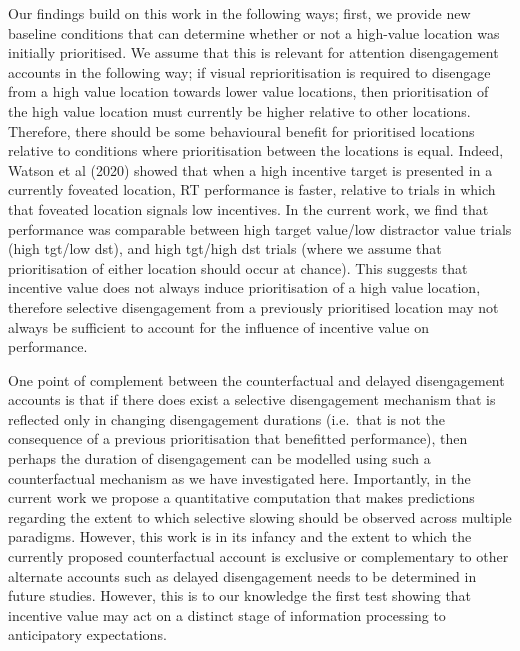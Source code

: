 \documentclass[11pt,halfline,a4paper,]{ouparticle}
\begin{document}
Our findings build on this work in the following ways; first, we provide new baseline conditions that can determine whether or not a high-value location was initially prioritised. We assume that this is relevant for attention disengagement accounts in the following way; if visual reprioritisation is required to disengage from a high value location towards lower value locations, then prioritisation of the high value location must currently be higher relative to other locations. Therefore, there should be some behavioural benefit for prioritised locations relative to conditions where prioritisation between the locations is equal. Indeed, Watson et al (2020) showed that when a high incentive target is presented in a currently foveated location, RT performance is faster, relative to trials in which that foveated location signals low incentives. In the current work, we find that performance was comparable between high target value/low distractor value trials (high tgt/low dst), and high tgt/high dst trials (where we assume that prioritisation of either location should occur at chance). This suggests that incentive value does not always induce prioritisation of a high value location, therefore selective disengagement from a previously prioritised location may not always be sufficient to account for the influence of incentive value on performance.

One point of complement between the counterfactual and delayed disengagement accounts is that if there does exist a selective disengagement mechanism that is reflected only in changing disengagement durations (i.e.~that is not the consequence of a previous prioritisation that benefitted performance), then perhaps the duration of disengagement can be modelled using such a counterfactual mechanism as we have investigated here. Importantly, in the current work we propose a quantitative computation that makes predictions regarding the extent to which selective slowing should be observed across multiple paradigms. However, this work is in its infancy and the extent to which the currently proposed counterfactual account is exclusive or complementary to other alternate accounts such as delayed disengagement needs to be determined in future studies. However, this is to our knowledge the first test showing that incentive value may act on a distinct stage of information processing to anticipatory expectations.
\end{document}
